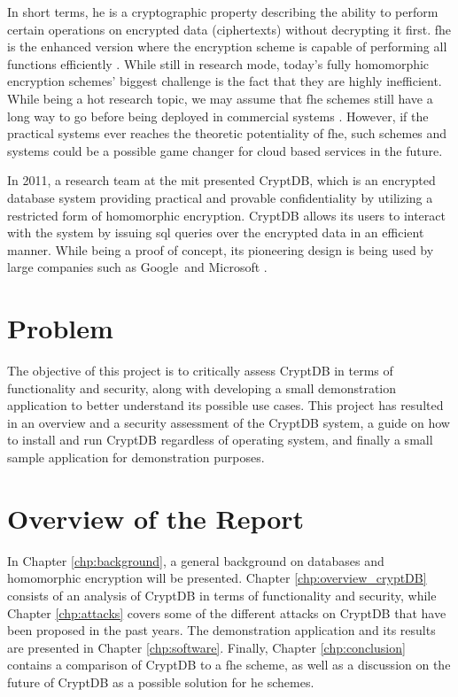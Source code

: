 In short terms, \gls{he} is a cryptographic property describing the ability to perform certain operations on encrypted data (ciphertexts) without decrypting it first. \gls{fhe} is the enhanced version where the encryption scheme is capable of performing all functions efficiently \cite{Gentry_thesis}. While still in research mode, today's fully homomorphic encryption schemes' biggest challenge is the fact that they are highly inefficient. While being a hot research topic, we may assume that \gls{fhe} schemes still have a long way to go before being deployed in commercial systems \cite{naehrig2011can}. However, if the practical systems ever reaches the theoretic potentiality of \gls{fhe}, such schemes and systems could be a possible game changer for cloud based services in the future.

In 2011, a research team at the \gls{mit} presented CryptDB, which is an encrypted database system providing practical and provable confidentiality by utilizing a restricted form of homomorphic encryption\cite{CryptDB_Main_Paper}. CryptDB allows its users to interact with the system by issuing \gls{sql} queries over the encrypted data in an efficient manner. While being a proof of concept, its pioneering design is being used by large companies such as Google\ and Microsoft \cite{cryptdb_homepage}.

\section{Problem}

The objective of this project is to critically assess CryptDB in terms of functionality and security, along with developing a small demonstration application to better understand its possible use cases. This project has resulted in an overview and a security assessment of the CryptDB system, a guide on how to install and run CryptDB regardless of operating system, and finally a small sample application for demonstration purposes.

\section{Overview of the Report}

In Chapter \ref{chp:background}, a general background on databases and homomorphic encryption will be presented. Chapter \ref{chp:overview_cryptDB} consists of an analysis of CryptDB in terms of functionality and security, while Chapter \ref{chp:attacks} covers some of the different attacks on CryptDB that have been proposed in the past years. The demonstration application and its results are presented in Chapter \ref{chp:software}. Finally, Chapter \ref{chp:conclusion} contains a comparison of CryptDB to a \gls{fhe} scheme, as well as a discussion on the future of CryptDB as a possible solution for \gls{he} schemes.